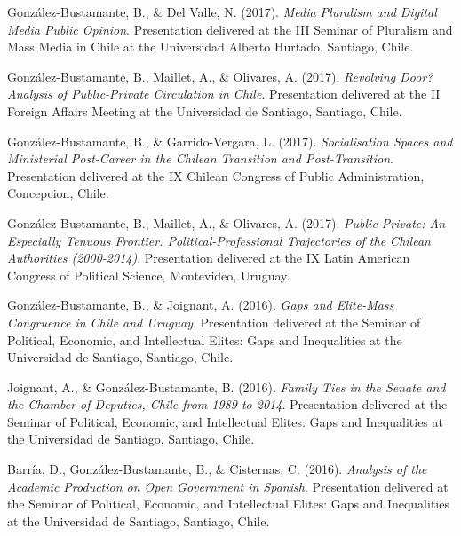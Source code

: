 \begin{publications}
\begin{benumerate}{71}
\item{\small González-Bustamante, B., \& Del Valle, N. (2017). {\itshape Media Pluralism and Digital Media Public Opinion}. Presentation delivered at the III Seminar of Pluralism and Mass Media in Chile at the Universidad Alberto Hurtado, Santiago, Chile.}\vspace{1mm}

\item{\small González-Bustamante, B., Maillet, A., \& Olivares, A. (2017). {\itshape Revolving Door? Analysis of Public-Private Circulation in Chile}. Presentation delivered at the II Foreign Affairs Meeting at the Universidad de Santiago, Santiago, Chile.}\vspace{1mm}

\item{\small González-Bustamante, B., \& Garrido-Vergara, L. (2017). {\itshape Socialisation Spaces and Ministerial Post-Career in the Chilean Transition and Post-Transition}. Presentation delivered at the IX Chilean Congress of Public Administration, Concepcion, Chile.}\vspace{1mm}

\item{\small González-Bustamante, B., Maillet, A., \& Olivares, A. (2017). {\itshape Public-Private: An Especially Tenuous Frontier. Political-Professional Trajectories of the Chilean Authorities (2000-2014)}. Presentation delivered at the IX Latin American Congress of Political Science, Montevideo, Uruguay.}\vspace{1mm}

\item{\small González-Bustamante, B., \& Joignant, A. (2016). {\itshape Gaps and Elite-Mass Congruence in Chile and Uruguay}. Presentation delivered at the Seminar of Political, Economic, and Intellectual Elites: Gaps and Inequalities at the Universidad de Santiago, Santiago, Chile.}\vspace{1mm}

\item{\small Joignant, A., \& González-Bustamante, B. (2016). {\itshape Family Ties in the Senate and the Chamber of Deputies, Chile from 1989 to 2014}. Presentation delivered at the Seminar of Political, Economic, and Intellectual Elites: Gaps and Inequalities at the Universidad de Santiago, Santiago, Chile.}\vspace{1mm}

\item{\small Barría, D., González-Bustamante, B., \& Cisternas, C. (2016). {\itshape Analysis of the Academic Production on Open Government in Spanish}. Presentation delivered at the Seminar of Political, Economic, and Intellectual Elites: Gaps and Inequalities at the Universidad de Santiago, Santiago, Chile.}\vspace{1mm}


\end{benumerate}
\end{publications}

